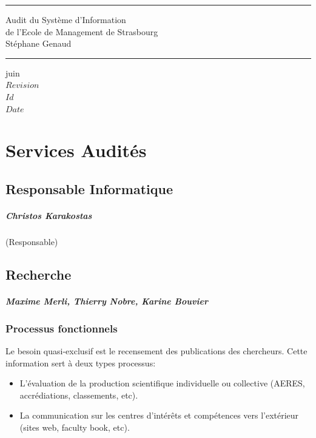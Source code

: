 \documentclass{book}
\begin{document}
\newcommand{\motcle}[1]{\index{#1}\emph{#1}}
\newcommand{\instrcle}[1]{\index{\texttt{#1}}\texttt{#1}}

\thispagestyle{empty}
\rhead[]{}
\pagestyle{fancy}
\setlength{\parindent}{0mm}
\setlength{\parskip}{0mm}
\rule{\linewidth}{1mm}
\begin{center}
\Large{Audit du Système d'Information}\\[5mm]
\Large{de l'Ecole de Management de Strasbourg}\\[5mm]
\large{Stéphane Genaud}
\rule{\linewidth}{1mm}
\end{center}
\begin{center}
juin  \\
\textrm{
$Revision$\\
$Id$\\
$Date$\\
}
\end{center}

\tableofcontents
\newpage

 
 

\chapter{Services Audités}
 

\section{Responsable Informatique}

\paragraph{Christos Karakostas} (Responsable)


\section{Recherche}
\paragraph{Maxime Merli, Thierry Nobre, Karine Bouvier}

\subsection{Processus fonctionnels}
Le besoin quasi-exclusif est le recensement des publications des chercheurs.
Cette information sert à deux types processus:
\begin{itemize}
\item L'évaluation de la production scientifique individuelle ou 
collective (AERES, accrédiations, classements, etc).
\item La communication sur les centres d'intérêts et compétences 
vers l'extérieur (sites web, faculty book, etc).
\end{itemize}
\end{document}

